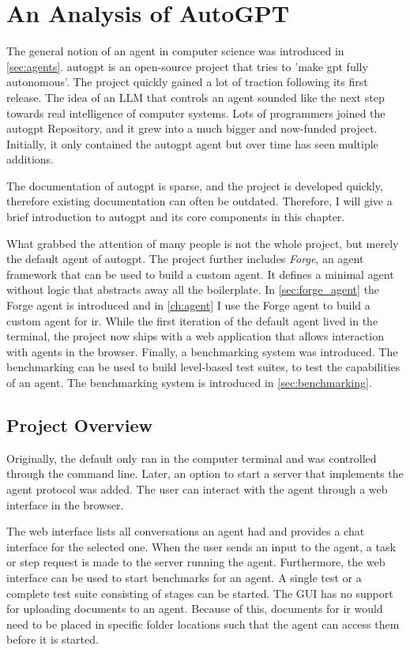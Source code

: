 \documentclass[../main.tex]{subfiles}
\begin{document}
\chapter{An Analysis of AutoGPT}
\label{ch:autogpt}

The general notion of an agent in computer science was introduced in \autoref{sec:agents}.
\gls{autogpt} is an open-source project that tries to 'make \gls{gpt} fully autonomous'.
The project quickly gained a lot of traction
following its first release.
The idea of an LLM that controls an agent sounded like the next step towards
real intelligence of computer systems.
Lots of programmers joined the \gls{autogpt} Repository,
and it grew into a much bigger and now-funded project.
Initially, it only contained the \gls{autogpt} agent
but over time has seen multiple additions.

The documentation of \gls{autogpt} is sparse,
and the project is developed quickly,
therefore existing documentation
can often be outdated.
Therefore, I will give a brief introduction to \gls{autogpt} and its core components
in this chapter.

What grabbed the attention of many people is not the whole project,
but merely the default agent of \gls{autogpt}.
The project further includes \emph{Forge},
an agent framework that can be used to build a custom agent.
It defines a minimal agent without logic
that abstracts away all the boilerplate.
In \autoref{sec:forge_agent} the Forge agent is introduced
and in \autoref{ch:agent} I use the Forge agent
to build a custom agent for \gls{ir}.
While the first iteration of the default agent lived in the terminal,
the project now ships with a web application
that allows interaction with agents in the browser.
Finally, a benchmarking system was introduced.
The benchmarking can be used to build level-based test suites,
to test the capabilities of an agent.
The benchmarking system is introduced in \autoref{sec:benchmarking}.

\section{Project Overview}

Originally,
the default only ran in the computer terminal
and was controlled through the command line.
Later, an option to start a server that implements the agent protocol was added.
The user can interact with the agent through a web interface in the browser.

The web interface lists all conversations an agent had and provides a chat interface for the selected one.
When the user sends an input to the agent, a task or step request is made to the server running the agent.
Furthermore, the web interface can be used to start benchmarks for an agent.
A single test or a complete test suite consisting of stages can be started.
The GUI has no support for uploading documents to an agent.
Because of this, documents for \gls{ir} would need to be placed in specific folder locations
such that the agent can access them before it is started.
\end{document}
